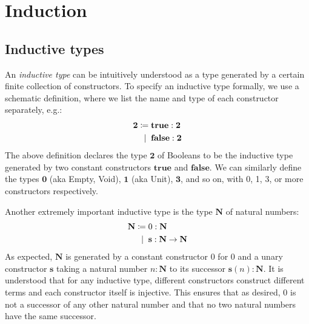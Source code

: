 \newcommand{\zero}{\ensuremath{\mathbf{0}}\xspace}
\newcommand{\one}{\ensuremath{\mathbf{1}}\xspace}
\newcommand{\two}{\ensuremath{\mathbf{2}}\xspace}
\newcommand{\three}{\ensuremath{\mathbf{3}}\xspace}
\newcommand{\nat}{\ensuremath{\mathbf{N}}\xspace}
\newcommand{\true}{\ensuremath{\mathbf{true}}\xspace}
\newcommand{\false}{\ensuremath{\mathbf{false}}\xspace}
\newcommand{\rec}{\ensuremath{\mathbf{rec}}\xspace}
\newcommand{\z}{\ensuremath{0}\xspace}
\newcommand{\s}{\ensuremath{\mathbf{s}}\xspace}
\newcommand{\alt}{\;|\;\;}
\newcommand{\der}{\vdash}

\chapter{Induction}
\label{cha:induction}


\section{Inductive types}

An \emph{inductive type} can be intuitively understood as a type generated by a certain finite collection of constructors. To specify an inductive type formally,
we use a schematic definition, where we list the name and type of each constructor separately, e.g.:
\begin{align*}
  \two \defeq \; & \true : \two \\
         \alt & \false : \two
\end{align*}
The above definition declares the type $\two$ of Booleans to be the inductive type generated by two constant constructors $\true$ and $\false$. We can similarly define the types $\zero$ (aka Empty, Void), $\one$ (aka Unit), $\three$, and so on, with 0, 1, 3, or more constructors respectively. 

Another extremely important inductive type is the type $\nat$ of natural numbers:  
\begin{align*}
  \nat \defeq \; & \z : \nat \\
        \alt & \s : \nat \to \nat 
\end{align*}
As expected, $\nat$ is generated by a constant constructor $\z$ for 0 and a unary constructor $\s$ taking a natural number $n : \nat$ to its successor $\s(n) : \nat$. It is understood that for any inductive type, different constructors construct different terms and each constructor itself is injective. This ensures that as desired, 0 is not a successor of any other natural number and that no two natural numbers have the same successor.

